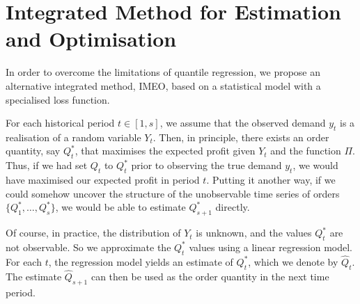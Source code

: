 \documentclass[a4paper,11pt]{article}
\begin{document}
\section{Integrated Method for Estimation and Optimisation} \label{se:new}

In order to overcome the limitations of quantile regression, we propose an alternative integrated method, IMEO, based on a statistical model with a specialised loss function.

For each historical period $t\in [1,s]$, we assume that the observed demand $y_t$ is a realisation of a random variable $Y_t$. Then, in principle, there exists an order quantity, say $Q_t^*$, that maximises the expected profit given $Y_t$ and the function $\Pi$. Thus, if we had set $Q_t$ to $Q_t^*$ prior to observing the true demand $y_t$, we would have maximised our expected profit in period $t$. Putting it another way, if we could somehow uncover the structure of the unobservable time series of orders $\big\{ Q_1^*,\dots,Q_s^* \big\}$, we would be able to estimate $Q_{s+1}^*$ directly.

Of course, in practice, the distribution of $Y_t$ is unknown, and the values $Q_t^*$ are not observable. So we approximate the $Q_t^*$ values using a linear regression model. For each $t$, the regression model yields an estimate of $Q^*_t$, which we denote by $\hat{Q}_t$. The estimate $\hat{Q}_{s+1}$ can then be used as the order quantity in the next time period.
\end{document}

